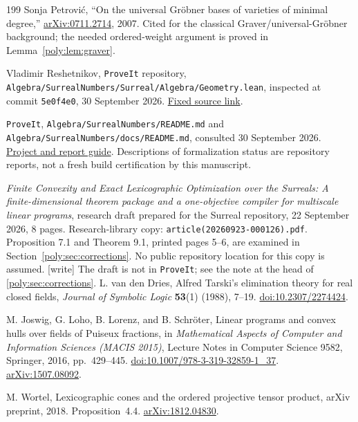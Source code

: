 \documentclass[11pt,a4paper]{article}
\numberwithin{equation}{section}
\theoremstyle{plain}
\newcommand{\wtag}{\textup{[write]}}%
\newcommand{\repo}{\texttt{ProveIt}}
\newcounter{polybibc}
\newenvironment{polybiblist}[1]{\let\section\subsection\renewcommand{\refname}{#1}%
 \begin{thebibliography}{199}\setcounter{enumiv}{\value{polybibc}}}%
 {\setcounter{polybibc}{\value{enumiv}}\end{thebibliography}}
\begin{document}
\begin{polybiblist}{Parts I and II (manuscripts 05 and 02)}
Sonja Petrovi\'c, ``On the universal Gr\"obner bases of varieties of
minimal degree,''
\href{https://arxiv.org/abs/0711.2714}{arXiv:0711.2714}, 2007.
Cited for the classical Graver/universal-Gr\"obner background; the needed
ordered-weight argument is proved in Lemma~\ref{poly:lem:graver}.

Vladimir Reshetnikov, \texttt{ProveIt} repository,
\nolinkurl{Algebra/SurrealNumbers/Surreal/Algebra/Geometry.lean},
inspected at commit \texttt{5e0f4e0}, 30 September 2026.
\href{https://github.com/VladimirReshetnikov/ProveIt/blob/5e0f4e05046bacda3c6ba2643f19b91aa632436b/Algebra/SurrealNumbers/Surreal/Algebra/Geometry.lean}{Fixed source link}.

\texttt{ProveIt}, \nolinkurl{Algebra/SurrealNumbers/README.md} and
\nolinkurl{Algebra/SurrealNumbers/docs/README.md}, consulted
30 September 2026.
\href{https://github.com/VladimirReshetnikov/ProveIt/tree/main/Algebra/SurrealNumbers}{Project and report guide}.
Descriptions of formalization status are repository reports, not a
fresh build certification by this manuscript.

\emph{Finite Convexity and Exact Lexicographic Optimization over the
Surreals: A finite-dimensional theorem package and a one-objective
compiler for multiscale linear programs}, research draft prepared for
the Surreal repository, 22 September 2026, 8 pages. Research-library copy:
\nolinkurl{article(20260923-000126).pdf}. Proposition 7.1 and Theorem 9.1,
printed pages 5--6, are examined in Section~\ref{poly:sec:corrections}.
No public repository location for this copy is assumed. \wtag{} The draft is not in \repo{}; see the note at the head of \cref{poly:sec:corrections}.
L. van den Dries,
Alfred Tarski's elimination theory for real closed fields,
\emph{Journal of Symbolic Logic} \textbf{53}(1) (1988), 7--19.
\href{https://doi.org/10.2307/2274424}{doi:10.2307/2274424}.

M. Joswig, G. Loho, B. Lorenz, and B. Schr\"oter,
Linear programs and convex hulls over fields of Puiseux fractions,
in \emph{Mathematical Aspects of Computer and Information Sciences
(MACIS 2015)}, Lecture Notes in Computer Science 9582,
Springer, 2016, pp.~429--445.
\href{https://doi.org/10.1007/978-3-319-32859-1_37}{doi:10.1007/978-3-319-32859-1\_37}.
\href{https://arxiv.org/abs/1507.08092}{arXiv:1507.08092}.

M. Wortel,
Lexicographic cones and the ordered projective tensor product,
arXiv preprint, 2018. Proposition~4.4.
\href{https://arxiv.org/abs/1812.04830}{arXiv:1812.04830}.


\end{polybiblist}
\end{document}
